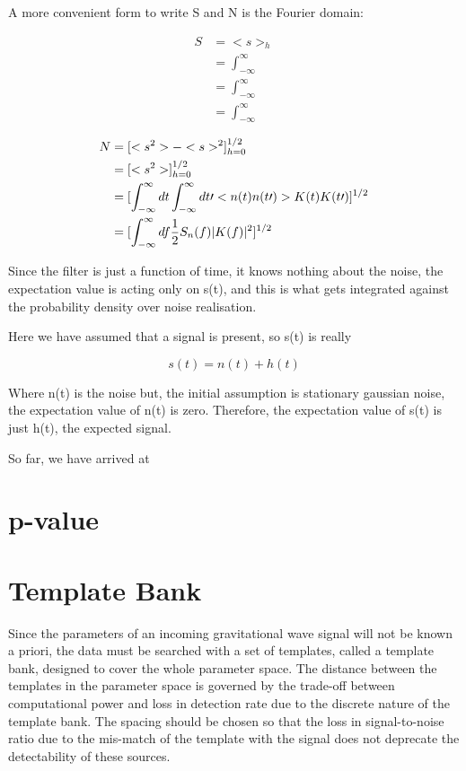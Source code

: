 \documentclass[binding=0.6cm, LaM]{sapthesis}
\begin{document}
	A more convenient form to write S and N is the Fourier domain: 

		\begin{align}
		S &= <s>_h \\
   		&= \int^{\infty}_{-\infty} \\
   		&= \int^{\infty}_{-\infty} \\
   		&= \int^{\infty}_{-\infty}
		\end{align}

		\begin{align}
		N &=[ <s^2> - <s>^2]^{1/2}_{h=0} \\
       		&= [ <s^2> ]^{1/2}_{h=0} \\
   		&= [\int^{\infty}_{-\infty} dt \int^{\infty}_{-\infty} dt \prime <n(t)n(t \prime)> K(t) K(t\prime)]^{1/2}\\
   		&= [\int^{\infty}_{-\infty} df {1 \over 2} S_n(f) |K(f)|^2]^{1/2}
		\end{align}

	Since the filter is just a function of time, it knows nothing about the noise, 
	the expectation value is acting only on s(t), 
	and this is what gets integrated against the probability density over noise realisation.

	Here we have assumed that a signal is present, so s(t) is really

		\begin{equation}
		s(t) = n(t) + h(t)
		\end{equation}

	Where n(t) is the noise but, the initial assumption is stationary gaussian noise, 
	the expectation value of n(t) is zero.
	Therefore, the expectation value of s(t) is just h(t), the expected signal. 


	So far, we have arrived at


\section{p-value}

\section{Template Bank}

	Since the parameters of an incoming gravitational wave signal will not be known a priori, 
	the data must be searched with a set of templates, 
	called a template bank, designed to cover the whole parameter space. 
	The distance between the templates in the parameter space is governed by the trade-off 
	between computational power and loss in detection rate due to the discrete nature of the template bank. 
	The spacing should be chosen so that the loss in signal-to-noise ratio 
	due to the mis-match of the template with the signal does not deprecate the detectability of these sources. 
\end{document}
